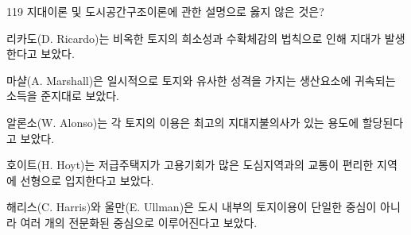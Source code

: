 \begin{question}{119}
지대이론 및 도시공간구조이론에 관한 설명으로 옳지 않은 것은?
\begin{choices}
  \item 리카도(D. Ricardo)는 비옥한 토지의 희소성과 수확체감의 법칙으로 인해 지대가 발생한다고 보았다.
  \item 마샬(A. Marshall)은 일시적으로 토지와 유사한 성격을 가지는 생산요소에 귀속되는 소득을 준지대로 보았다.
  \item 알론소(W. Alonso)는 각 토지의 이용은 최고의 지대지불의사가 있는 용도에 할당된다고 보았다.
  \item 호이트(H. Hoyt)는 저급주택지가 고용기회가 많은 도심지역과의 교통이 편리한 지역에 선형으로 입지한다고 보았다.
  \item 해리스(C. Harris)와 울만(E. Ullman)은 도시 내부의 토지이용이 단일한 중심이 아니라 여러 개의 전문화된 중심으로 이루어진다고 보았다.
\end{choices}
\end{question}
